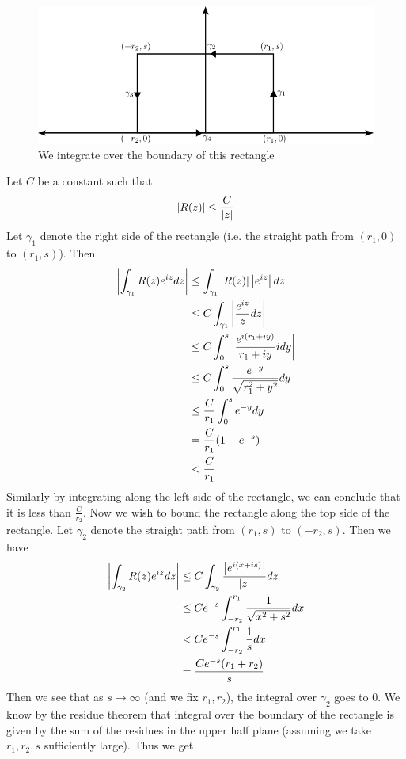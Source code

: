 \begin{figure}[ht]
    \centering
    \includegraphics{Images/rational_exp_contour.png}
    \caption{We integrate over the boundary of this rectangle}
    \label{fig:rational-exp-contour}
\end{figure}

Let $C$ be a constant such that
$$ \left|R(z)\right| \leq \frac{C}{\left|z\right|} $$
Let $\gamma_1$ denote the right side of the rectangle (i.e. the straight path from $(r_1, 0)$ to $(r_1, s)$). Then
\begin{align*}
   \left|\int_{\gamma_1} R(z) e^{iz} dz\right| &\leq \int_{\gamma_1} \left|R(z)\right| \left|e^{iz}\right| dz\\
   &\leq C \int_{\gamma_1} \left| \frac{e^{iz}}{z} dz \right|\\
   &\leq C \int_{0}^s \left|\frac{e^{i(r_1 + iy)}}{r_1 + iy} idy\right|\\
   &\leq C \int_{0}^s \frac{e^{-y}}{\sqrt{r_1^2 + y^2}} dy\\
   &\leq \frac{C}{r_1} \int_0^s e^{-y} dy\\
   &= \frac{C}{r_1}(1 - e^{-s})\\
   &< \frac{C}{r_1}
 \end{align*}
Similarly by integrating along the left side of the rectangle, we can conclude that it is less than $\frac{C}{r_2}$. Now we wish to bound the rectangle along the top side of the rectangle. Let $\gamma_2$ denote the straight path from $(r_1, s)$ to $(-r_2, s)$. Then we have 
\begin{align*}
    \left|\int_{\gamma_2} R(z) e^{iz} dz\right| &\leq C \int_{\gamma_2} \frac{\left|e^{i(x + is)}\right|}{\left|z\right|} dz\\
    &\leq Ce^{-s} \int_{-r_2}^{r_1} \frac{1}{\sqrt{x^2 + s^2}} dx\\
    &< Ce^{-s} \int_{-r_2}^{r_1}\frac{1}{s} dx\\
    &= \frac{Ce^{-s}(r_1 + r_2)}{s}
 \end{align*}
 Then we see that as $s \to \infty$ (and we fix $r_1, r_2$), the integral over $\gamma_2$ goes to 0. We know by the residue theorem that integral over the boundary of the rectangle is given by the sum of the residues in the upper half plane (assuming we take $r_1, r_2, s$ sufficiently large). Thus we get
